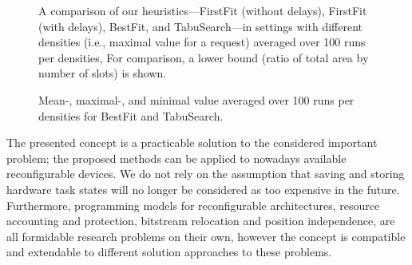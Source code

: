 \documentclass[10pt,journal]{IEEEtran}
\begin{document}
\begin{figure}[t]
\centerline{}
\caption{
A comparison of our 
heuristics---FirstFit (without delays),  FirstFit (with delays), BestFit, 
and TabuSearch---in settings with 
different densities (i.e., maximal value for a request) averaged over 100 runs
per densities, For comparison, a lower bound
(ratio of total area by number of slots) is shown.
\label{fpgatris-plot-fig}}
\end{figure}

\begin{figure}[t]
\centerline{}
\caption{Mean-, maximal-, and minimal value averaged over 100 runs
per densities for BestFit and TabuSearch.\newline
~\newline
~\newline
\label{fpgatris-ploterr-fig}}
\end{figure}

The presented concept is a practicable solution to the considered
important problem; the proposed methods can be
applied to nowadays available reconfigurable devices. 
We do not rely on the assumption that saving and storing
hardware task states will no longer be considered as too expensive in the
future. Furthermore, programming models for reconfigurable
architectures, resource accounting and protection, bitstream
relocation and position independence, are all formidable research
problems on their own, however the concept is compatible and
extendable to different solution approaches to these problems.



\end{document}
